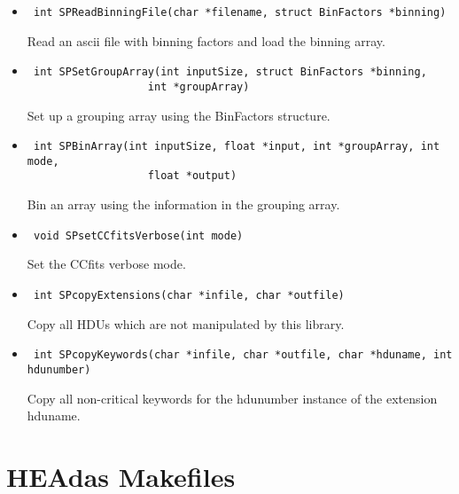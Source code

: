 \documentclass[11pt]{book}
\begin{document}
\begin{itemize}

\item      \begin{verbatim} int SPReadBinningFile(char *filename, struct BinFactors *binning)\end{verbatim}

               Read an ascii file with binning factors and load the binning array.

\item      \begin{verbatim} int SPSetGroupArray(int inputSize, struct BinFactors *binning, 
                   int *groupArray)\end{verbatim}

               Set up a grouping array using the BinFactors structure.

\item      \begin{verbatim} int SPBinArray(int inputSize, float *input, int *groupArray, int mode, 
                   float *output)\end{verbatim}

               Bin an array using the information in the grouping array.

\item      \begin{verbatim} void SPsetCCfitsVerbose(int mode)\end{verbatim}

               Set the CCfits verbose mode.

\item      \begin{verbatim} int SPcopyExtensions(char *infile, char *outfile)\end{verbatim}

               Copy all HDUs which are not manipulated by this library.

\item      \begin{verbatim} int SPcopyKeywords(char *infile, char *outfile, char *hduname, int hdunumber)\end{verbatim}

               Copy all non-critical keywords for the hdunumber
               instance of the extension hduname.

\end{itemize}


\chapter{HEAdas Makefiles}
\end{document}
